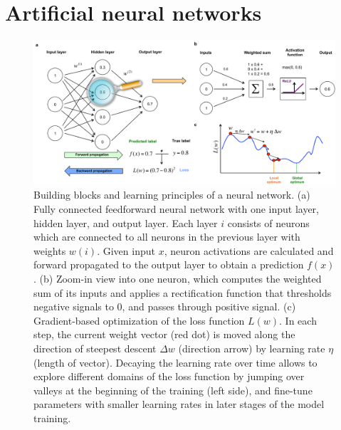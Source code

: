 \section{Artificial neural networks}

\begin{figure}[htbp!]
\centering
\includegraphics[width=1.0\textwidth]{ann}
\caption[Building blocks and learning principles of a neural network.]{Building blocks and learning principles of a neural network. (a) Fully connected feedforward neural network with one input layer, hidden layer, and output layer.  Each layer $i$ consists of neurons which are connected to all neurons in the previous layer with weights $w(i)$. Given input $x$, neuron activations are calculated and forward propagated to the output layer to obtain a prediction $f(x)$. (b) Zoom-in view into one neuron, which computes the weighted sum of its inputs and applies a rectification function that thresholds negative signals to $0$, and passes through positive signal. (c) Gradient-based optimization of the loss function $L(w)$. In each step, the current weight vector (red dot) is moved along the direction of steepest descent $\Delta w$ (direction arrow) by learning rate $\eta$ (length of vector). Decaying the learning rate over time allows to explore different domains of the loss function by jumping over valleys at the beginning of the training (left side), and fine-tune parameters with smaller learning rates in later stages of the model training.}
\label{fig:dl_ann}
\end{figure}

